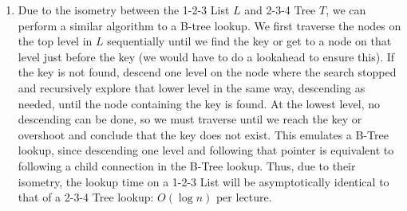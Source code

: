 \documentclass{article}
\theoremstyle{casestyle}
\begin{document}
\begin{enumerate}[i]
\begin{enumerate}[i]
  \item Due to the isometry between the 1-2-3 List $L$ and 2-3-4 Tree $T$, we can perform a similar algorithm to a B-tree lookup. We first traverse the nodes on the top level in $L$ sequentially until we find the key or get to a node on that level just before the key (we would have to do a lookahead to ensure this). If the key is not found, descend one level on the node where the search stopped and recursively explore that lower level in the same way, descending as needed, until the node containing the key is found. At the lowest level, no descending can be done, so we must traverse until we reach the key or overshoot and conclude that the key does not exist. This emulates a B-Tree lookup, since descending one level and following that pointer is equivalent to following a child connection in the B-Tree lookup. Thus, due to their isometry, the lookup time on a 1-2-3 List will be asymptotically identical to that of a 2-3-4 Tree lookup: $O(\log n)$ per lecture.


\end{enumerate}
\end{enumerate}
\end{document}
